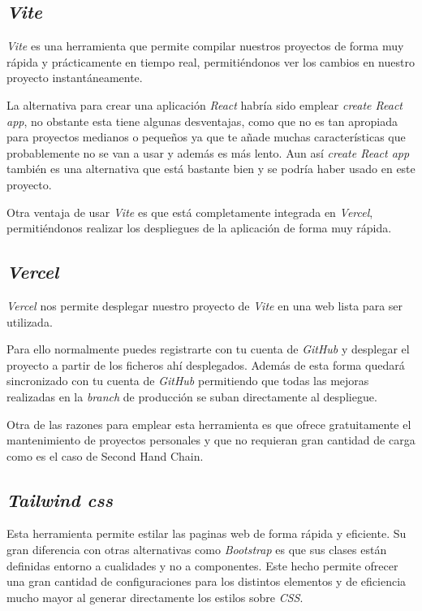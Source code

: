\subsection{\textit{Vite}}
\textit{Vite}\cite{vitejsVite} es una herramienta que permite compilar nuestros proyectos de forma muy rápida y prácticamente en tiempo real, permitiéndonos ver los cambios en nuestro proyecto instantáneamente.

La alternativa para crear una aplicación \textit{React} habría sido emplear \textit{create React app}, no obstante esta tiene algunas desventajas, como que no es tan apropiada para proyectos medianos o pequeños ya que te añade muchas características que probablemente no se van a usar y además es más lento. Aun así \textit{create React app} también es una alternativa que está bastante bien y se podría haber usado en este proyecto\cite{devCreateReact}.

Otra ventaja de usar \textit{Vite} es que está completamente integrada en \textit{Vercel}, permitiéndonos realizar los despliegues de la aplicación de forma muy rápida.

\subsection{\textit{Vercel}}
\textit{Vercel}\cite{vercelProjectsDeployments} nos permite desplegar nuestro proyecto de \textit{Vite} en una web lista para ser utilizada.

Para ello normalmente puedes registrarte con tu cuenta de \textit{GitHub} y desplegar el proyecto a partir de los ficheros ahí desplegados. Además de esta forma quedará sincronizado con tu cuenta de \textit{GitHub} permitiendo que todas las mejoras realizadas en la \textit{branch} de producción se suban directamente al despliegue.

Otra de las razones para emplear esta herramienta es que ofrece gratuitamente el mantenimiento de proyectos personales y que no requieran gran cantidad de carga como es el caso de Second Hand Chain.

\subsection{\textit{Tailwind css}}
Esta herramienta permite estilar las paginas web de forma rápida y eficiente. Su gran diferencia con otras alternativas como \textit{Bootstrap} es que sus clases están definidas entorno a cualidades y no a componentes. Este hecho permite ofrecer una gran cantidad de configuraciones para los distintos elementos y de eficiencia mucho mayor al generar directamente los estilos sobre \textit{CSS}.

